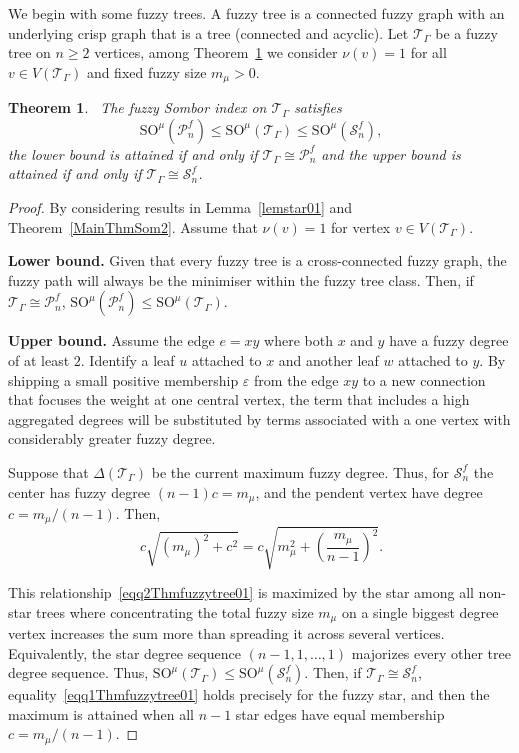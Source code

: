 \documentclass[12pt]{amsart}
\newtheorem{theorem}{Theorem}[section]
\newcommand{\SOG}{\mathrm{SO}^{\mu}}
\newcommand{\PP}{\mathcal{P}}
\newcommand{\SN}{\mathcal{S}}
\newcommand{\TG}{\mathcal{T}_{\Gamma}}
\begin{document}
We begin with some fuzzy trees. A fuzzy tree is a connected fuzzy graph with an underlying crisp graph that is a tree (connected and acyclic).
Let $\TG$ be a fuzzy tree on $n \geq 2$ vertices, among Theorem~\ref{Thmfuzzytree01} we consider $\nu(v) = 1$ for all $v\in V(\TG)$ and fixed fuzzy size $m_{\mu} > 0$.
\begin{theorem}~\label{Thmfuzzytree01}
 The fuzzy Sombor index on $\TG$ satisfies
 \begin{equation}~\label{eqq1Thmfuzzytree01}
\SOG(\PP_n^f) \leqslant \SOG(\TG) \leqslant \SOG(\SN_n^f),
 \end{equation}
the lower bound is attained if and only if $\TG\cong \PP_n^f$ and the upper bound is attained if and only if $\TG\cong \SN_n^f$. 
\end{theorem}
\begin{proof}
By considering results in Lemma~\ref{lemstar01} and Theorem~\ref{MainThmSom2}. Assume that $\nu(v)=1$ for vertex $v\in V(\TG)$.

\medskip 

  {\bf Lower bound.} Given that every fuzzy tree is a cross-connected fuzzy graph, the fuzzy path will always be the minimiser within the fuzzy tree class. Then, if $\TG\cong \PP_n^f$, $\SOG(\PP_n^f) \leqslant \SOG(\TG)$. 

\medskip

  {\bf Upper bound.} Assume the edge $e=xy$ where both $x$ and $y$ have a fuzzy degree of at least $2$. Identify a leaf $u$ attached to $x$ and another leaf $w$ attached to $y$. By shipping a small positive membership $\varepsilon$ from the edge $xy$ to a new connection that focuses the weight at one central vertex, the term that includes a high aggregated degrees will be substituted by terms associated with a one vertex with considerably greater fuzzy degree.

Suppose that $\Delta(\TG)$ be the current maximum fuzzy degree. Thus,  for $\SN_n^f$ the center has fuzzy degree $(n-1)c=m_{\mu}$, and the pendent vertex have degree $c=m_{\mu}/(n-1)$. Then, 
\begin{equation}~\label{eqq2Thmfuzzytree01}
 c \sqrt{(m_{\mu})^2 + c^2} = c \sqrt{m_{\mu}^2 + \left(\frac{m_{\mu}}{n-1}\right)^2}.   
\end{equation}

This relationship~\eqref{eqq2Thmfuzzytree01} is maximized by the star among all non-star trees where concentrating the total fuzzy size $m_\mu$ on a single biggest degree vertex increases the sum more than spreading it across several vertices. Equivalently, the star degree sequence $(n-1,1,\dots,1)$ majorizes every other tree degree sequence. Thus,  $\SOG(\TG) \leqslant \SOG(\SN_n^f)$. Then, if $\TG\cong \SN_n^f$, equality~\eqref{eqq1Thmfuzzytree01} holds precisely for the fuzzy star, and then the maximum is attained when all $n-1$ star edges have equal membership $c=m_\mu/(n-1)$.
\end{proof}
\end{document}
